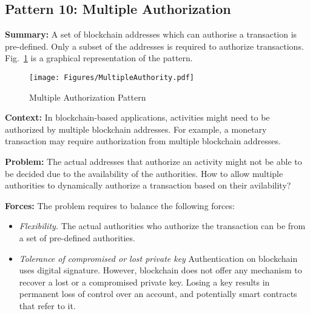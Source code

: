 
\subsection{ \textbf{Pattern 10: Multiple Authorization}}
\label{sec:authority}

\noindent \textbf{Summary:} A set of blockchain addresses which can authorise a transaction is pre-defined. Only a subset of the addresses is required to authorize transactions. Fig.~\ref{fig:multipleauthority} is a graphical representation of the pattern.

\begin{figure}[t]
\begin{center}
\texttt{[image: Figures/MultipleAuthority.pdf]}
\caption{Multiple Authorization Pattern}\label{fig:multipleauthority}
\end{center}
\end{figure}

\vspace{0.5em}\noindent \textbf{Context:} 
In blockchain-based applications, activities might need to be authorized by multiple blockchain addresses. For example, a monetary transaction may require authorization from multiple blockchain addresses.

\vspace{0.5em}\noindent \textbf{Problem:} 
The actual addresses that authorize an activity might not be able to be decided due to the availability of the authorities. How to allow multiple authorities to dynamically authorize a transaction based on their avilability?

\vspace{0.5em}\noindent \textbf{Forces:} The problem requires to balance the following forces:
\begin{itemize}
  \item \textit{Flexibility.} The actual authorities who authorize the transaction can be from a set of pre-defined authorities. 
  \item \textit{Tolerance of compromised or lost private key} Authentication on blockchain uses digital signature. However, blockchain does not offer any mechanism to recover a lost or a compromised private key. Losing a key results in permanent loss of control over an account, and potentially smart contracts that refer to it. %
\end{itemize}

